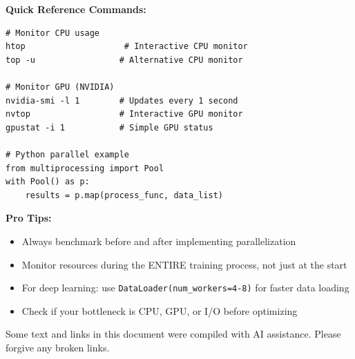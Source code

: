 \documentclass[11pt,a4paper]{article}
\begin{document}
\textbf{Quick Reference Commands:}
\begin{verbatim}
# Monitor CPU usage
htop                    # Interactive CPU monitor
top -u                 # Alternative CPU monitor

# Monitor GPU (NVIDIA)
nvidia-smi -l 1        # Updates every 1 second
nvtop                  # Interactive GPU monitor
gpustat -i 1           # Simple GPU status

# Python parallel example
from multiprocessing import Pool
with Pool() as p:
    results = p.map(process_func, data_list)
\end{verbatim}

\textbf{Pro Tips:}
\begin{itemize}
    \item Always benchmark before and after implementing parallelization
    \item Monitor resources during the ENTIRE training process, not just at the start
    \item For deep learning: use \texttt{DataLoader(num\_workers=4-8)} for faster data loading
    \item Check if your bottleneck is CPU, GPU, or I/O before optimizing
\end{itemize}

\vspace{1cm}
\begin{tcolorbox}[colback=gray!10,colframe=gray!50,title=AI Disclosure]
Some text and links in this document were compiled with AI assistance. Please forgive any broken links.
\end{tcolorbox}
\end{document}
